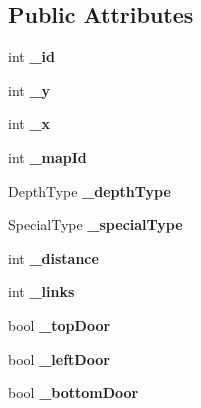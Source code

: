 \subsection*{Public Attributes}
\begin{DoxyCompactItemize}
\item 
\hypertarget{class_room_aa97bb98fc26b53ea69dc2ead93c1f387}{int {\bfseries \+\_\+id}}\label{class_room_aa97bb98fc26b53ea69dc2ead93c1f387}

\item 
\hypertarget{class_room_a5bc1a09de14c29a10d5fea5a8f2e98de}{int {\bfseries \+\_\+y}}\label{class_room_a5bc1a09de14c29a10d5fea5a8f2e98de}

\item 
\hypertarget{class_room_adc7126011673a7372edc89316d7ba92f}{int {\bfseries \+\_\+x}}\label{class_room_adc7126011673a7372edc89316d7ba92f}

\item 
\hypertarget{class_room_a66b1c60370ab2db3210f1d5ade08ee78}{int {\bfseries \+\_\+map\+Id}}\label{class_room_a66b1c60370ab2db3210f1d5ade08ee78}

\item 
\hypertarget{class_room_a55bce8c6ce0d3d262b1067df6e8c0d51}{Depth\+Type {\bfseries \+\_\+depth\+Type}}\label{class_room_a55bce8c6ce0d3d262b1067df6e8c0d51}

\item 
\hypertarget{class_room_a80c70edbe9ec51b121504cd943218eac}{Special\+Type {\bfseries \+\_\+special\+Type}}\label{class_room_a80c70edbe9ec51b121504cd943218eac}

\item 
\hypertarget{class_room_a2aea023acbf7a7d3c1c7eb2c60383b61}{int {\bfseries \+\_\+distance}}\label{class_room_a2aea023acbf7a7d3c1c7eb2c60383b61}

\item 
\hypertarget{class_room_aa1afece5a895b2154352321935144897}{int {\bfseries \+\_\+links}}\label{class_room_aa1afece5a895b2154352321935144897}

\item 
\hypertarget{class_room_ac5e9fd2433a13bcd80f128034b6a2a11}{bool {\bfseries \+\_\+top\+Door}}\label{class_room_ac5e9fd2433a13bcd80f128034b6a2a11}

\item 
\hypertarget{class_room_a69527ff853d558a8ada29a9ffa773e9f}{bool {\bfseries \+\_\+left\+Door}}\label{class_room_a69527ff853d558a8ada29a9ffa773e9f}

\item 
\hypertarget{class_room_a33d03dec3d68b42ff5a46edd48a87846}{bool {\bfseries \+\_\+bottom\+Door}}\label{class_room_a33d03dec3d68b42ff5a46edd48a87846}


\end{DoxyCompactItemize}
